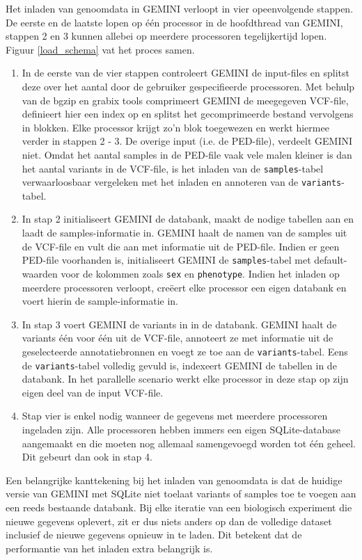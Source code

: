 \noindent Het inladen van genoomdata in GEMINI verloopt in vier opeenvolgende stappen. De eerste en de laatste lopen op \'e\'en processor in de hoofdthread van GEMINI, stappen 2 en 3 kunnen allebei op meerdere processoren tegelijkertijd lopen. Figuur \ref{load_schema} vat het proces samen.
\begin{enumerate}
\item In de eerste van de vier stappen controleert GEMINI de input-files en splitst deze over het aantal door de gebruiker gespecifieerde processoren. Met behulp van de bgzip \cite{bgzip} en grabix \cite{grabix} tools comprimeert GEMINI de meegegeven VCF-file, definieert hier een index op en splitst het gecomprimeerde bestand vervolgens in blokken. Elke processor krijgt zo'n blok toegewezen en werkt hiermee verder in stappen 2 - 3. De overige input (i.e. de PED-file), verdeelt GEMINI niet. Omdat het aantal samples in de PED-file vaak vele malen kleiner is dan het aantal variants in de VCF-file, is het inladen van de \texttt{samples}-tabel verwaarloosbaar vergeleken met het inladen en annoteren van de \texttt{variants}-tabel.
\item In stap 2 initialiseert GEMINI de databank, maakt de nodige tabellen aan en laadt de samples-informatie in. GEMINI haalt de namen van de samples uit de VCF-file en vult die aan met informatie uit de PED-file. Indien er geen PED-file voorhanden is, initialiseert GEMINI de \texttt{samples}-tabel met default-waarden voor de kolommen zoals \texttt{sex} en \texttt{phenotype}. Indien het inladen op meerdere processoren verloopt, cre\"eert elke processor een eigen databank en voert hierin de sample-informatie in.
\item In stap 3 voert GEMINI de variants in in de databank. GEMINI haalt de variants \'e\'en voor \'e\'en uit de VCF-file, annoteert ze met informatie uit de geselecteerde annotatiebronnen en voegt ze toe aan de \texttt{variants}-tabel. Eens de \texttt{variants}-tabel volledig gevuld is, indexeert GEMINI de tabellen in de databank. In het parallelle scenario werkt elke processor in deze stap op zijn eigen deel van de input VCF-file.
\item Stap vier is enkel nodig wanneer de gegevens met meerdere processoren ingeladen zijn. Alle processoren hebben immers een eigen SQLite-database aangemaakt en die moeten nog allemaal samengevoegd worden tot \'e\'en geheel. Dit gebeurt dan ook in stap 4.
\end{enumerate}

Een belangrijke kanttekening bij het inladen van genoomdata is dat de huidige versie van GEMINI met SQLite niet toelaat variants of samples toe te voegen aan een reeds bestaande databank. Bij elke iteratie van een biologisch experiment die nieuwe gegevens oplevert, zit er dus niets anders op dan de volledige dataset inclusief de nieuwe gegevens opnieuw in te laden. Dit betekent dat de performantie van het inladen extra belangrijk is.

